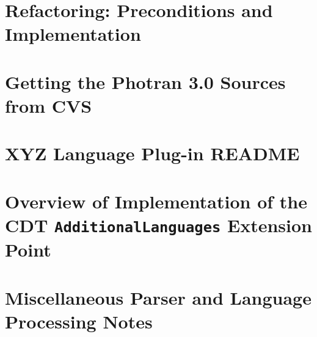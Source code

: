\documentclass[10pt,letterpaper]{report}
\begin{document}
\chapter{Refactoring: Preconditions and Implementation}


\appendix

\chapter{Getting the Photran 3.0 Sources from CVS}
\vspace{0.5em}


\chapter{XYZ Language Plug-in README}


\chapter{Overview of Implementation of the CDT \texttt{AdditionalLanguages}
         Extension Point}


\chapter{Miscellaneous Parser and Language Processing Notes}


\end{document}
